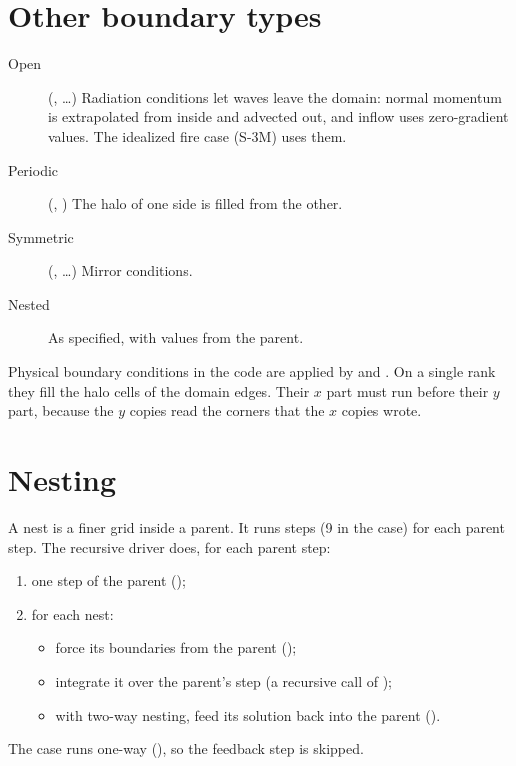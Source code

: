 \section{Other boundary types}

\begin{description}
  \item[Open] (, \dots) Radiation conditions let waves leave the domain: normal momentum is extrapolated
    from inside and advected out, and inflow uses zero-gradient values. The idealized fire case (S-3M) uses them.
  \item[Periodic] (, ) The halo of one side is filled from the other.
  \item[Symmetric] (, \dots) Mirror conditions.
  \item[Nested] As specified, with values from the parent.
\end{description}
Physical boundary conditions in the code are applied by
 and . On a single rank they fill the halo cells of
the domain edges. Their $x$ part must run before their $y$ part, because the $y$ copies read the corners that the $x$
copies wrote.

\section{Nesting}

A nest is a finer grid inside a parent. It runs  steps (9 in the case) for each parent
step. The recursive driver  does, for each parent step:
\begin{enumerate}
  \item one step of the parent ();
  \item for each nest:
    \begin{itemize}
      \item force its boundaries from the parent ();
      \item integrate it over the parent's step (a recursive call of );
      \item with two-way nesting, feed its solution back into the parent ().
    \end{itemize}
\end{enumerate}
The case runs one-way (), so the feedback step is skipped.

